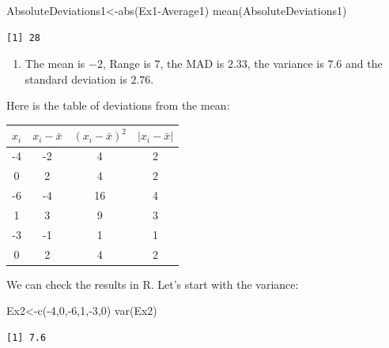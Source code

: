 \documentclass[
  letterpaper,
  DIV=11,
  numbers=noendperiod]{scrreprt}
\newenvironment{Shaded}{\begin{snugshade}}{\end{snugshade}}
\newcommand{\DecValTok}[1]{\textcolor[rgb]{0.68,0.00,0.00}{#1}}
\newcommand{\FunctionTok}[1]{\textcolor[rgb]{0.28,0.35,0.67}{#1}}
\newcommand{\NormalTok}[1]{\textcolor[rgb]{0.00,0.23,0.31}{#1}}
\newcommand{\OtherTok}[1]{\textcolor[rgb]{0.00,0.23,0.31}{#1}}
\newcommand{\SpecialCharTok}[1]{\textcolor[rgb]{0.37,0.37,0.37}{#1}}
\providecommand{\tightlist}{%
  \setlength{\itemsep}{0pt}\setlength{\parskip}{0pt}}\usepackage{longtable,booktabs,array}
\begin{document}
\begin{Shaded}
\begin{Highlighting}[numbers=left,,]
\NormalTok{AbsoluteDeviations1}\OtherTok{\textless{}{-}}\FunctionTok{abs}\NormalTok{(Ex1}\SpecialCharTok{{-}}\NormalTok{Average1)}
\FunctionTok{mean}\NormalTok{(AbsoluteDeviations1)}
\end{Highlighting}
\end{Shaded}

\begin{verbatim}
[1] 28
\end{verbatim}

\begin{enumerate}
\def\labelenumi{\arabic{enumi}.}
\setcounter{enumi}{1}
\tightlist
\item
  The mean is \(-2\), Range is \(7\), the MAD is \(2.33\), the variance
  is \(7.6\) and the standard deviation is \(2.76\).
\end{enumerate}

Here is the table of deviations from the mean:

\begin{longtable}[]{@{}cccc@{}}
\toprule()
\(x_{i}\) & \(x_{i}-\bar{x}\) & \((x_{i}-\bar{x})^2\) &
\(|x_{i}-\bar{x}|\) \\
\midrule()
\endhead
-4 & -2 & 4 & 2 \\
0 & 2 & 4 & 2 \\
-6 & -4 & 16 & 4 \\
1 & 3 & 9 & 3 \\
-3 & -1 & 1 & 1 \\
0 & 2 & 4 & 2 \\
\bottomrule()
\end{longtable}

We can check the results in R. Let's start with the variance:

\begin{Shaded}
\begin{Highlighting}[numbers=left,,]
\NormalTok{Ex2}\OtherTok{\textless{}{-}}\FunctionTok{c}\NormalTok{(}\SpecialCharTok{{-}}\DecValTok{4}\NormalTok{,}\DecValTok{0}\NormalTok{,}\SpecialCharTok{{-}}\DecValTok{6}\NormalTok{,}\DecValTok{1}\NormalTok{,}\SpecialCharTok{{-}}\DecValTok{3}\NormalTok{,}\DecValTok{0}\NormalTok{)}
\FunctionTok{var}\NormalTok{(Ex2)}
\end{Highlighting}
\end{Shaded}

\begin{verbatim}
[1] 7.6
\end{verbatim}
\end{document}
